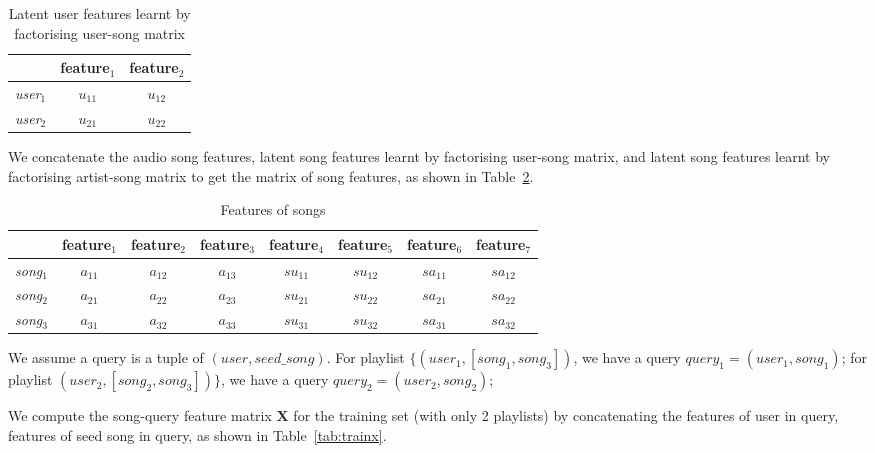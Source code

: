 \begin{table}[h!]
\centering
\begin{tabular}{l|cc} \hline \hline 
& feature$_1$ & feature$_2$ \\ \hline
{\it user}$_1$ & $u_{11}$ & $u_{12}$ \\
{\it user}$_2$ & $u_{21}$ & $u_{22}$ \\ \hline
\end{tabular}
\caption{Latent user features learnt by factorising user-song matrix}
\label{tab:user-song}
\end{table}

We concatenate the audio song features, 
latent song features learnt by factorising user-song matrix,
and latent song features learnt by factorising artist-song matrix 
to get the matrix of song features, as shown in Table~\ref{tab:song}.

\begin{table}[h!]
\centering
\begin{tabular}{l|ccc|cc|cc} \hline \hline 
& feature$_1$ & feature$_2$ & feature$_3$ & feature$_4$ & feature$_5$ & feature$_6$ & feature$_7$ \\ \hline
{\it song}$_1$ & $a_{11}$ & $a_{12}$ & $a_{13}$ & $su_{11}$ & $su_{12}$ & $sa_{11}$ & $sa_{12}$ \\          
{\it song}$_2$ & $a_{21}$ & $a_{22}$ & $a_{23}$ & $su_{21}$ & $su_{22}$ & $sa_{21}$ & $sa_{22}$ \\          
{\it song}$_3$ & $a_{31}$ & $a_{32}$ & $a_{33}$ & $su_{31}$ & $su_{32}$ & $sa_{31}$ & $sa_{32}$ \\ \hline
\end{tabular}
\caption{Features of songs}
\label{tab:song}
\end{table}

We assume a query is a tuple of $(\textit{user}, \textit{seed\_song})$.
For playlist $\{(\textit{user}_1, [\textit{song}_1, \textit{song}_3])$,
we have a query $\textit{query}_1 = (\textit{user}_1, \textit{song}_1)$;
for playlist $(\textit{user}_2, [\textit{song}_2, \textit{song}_3])\}$,
we have a query $\textit{query}_2 = (\textit{user}_2, \textit{song}_2)$;

We compute the song-query feature matrix $\mathbf{X}$ for the training set (with only 2 playlists) 
by concatenating the features of user in query, features of seed song in query, as shown in Table~\ref{tab:trainx}.

